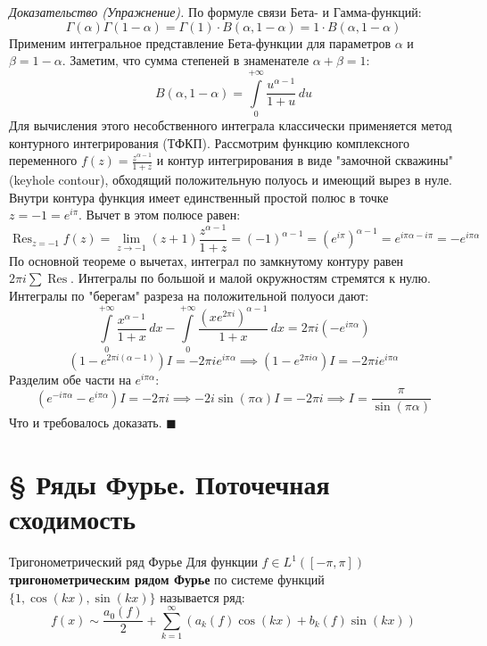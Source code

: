 \documentclass[12pt,a4paper]{article}
\newenvironment{Proof}[1][Доказательство]{\vspace{0.5em}\noindent\textit{#1.}\hspace{0.5em}\ignorespaces}{\hfill$\blacksquare$\vspace{1em}}
\begin{document}
\begin{Proof}[Доказательство (Упражнение)]
По формуле связи Бета- и Гамма-функций:
$$ \Gamma(\alpha)\Gamma(1-\alpha) = \Gamma(1) \cdot B(\alpha, 1-\alpha) = 1 \cdot B(\alpha, 1-\alpha) $$
Применим интегральное представление Бета-функции для параметров $\alpha$ и $\beta = 1-\alpha$. Заметим, что сумма степеней в знаменателе $\alpha + \beta = 1$:
$$ B(\alpha, 1-\alpha) = \int\limits_0^{+\infty} \frac{u^{\alpha-1}}{1+u} \, du $$
Для вычисления этого несобственного интеграла классически применяется метод контурного интегрирования (ТФКП). 
Рассмотрим функцию комплексного переменного $f(z) = \frac{z^{\alpha-1}}{1+z}$ и контур интегрирования в виде "замочной скважины" (keyhole contour), обходящий положительную полуось и имеющий вырез в нуле. Внутри контура функция имеет единственный простой полюс в точке $z = -1 = e^{i\pi}$.
Вычет в этом полюсе равен:
$$ \operatorname{Res}_{z=-1} f(z) = \lim\limits_{z \to -1} (z+1) \frac{z^{\alpha-1}}{1+z} = (-1)^{\alpha-1} = (e^{i\pi})^{\alpha-1} = e^{i\pi\alpha - i\pi} = -e^{i\pi\alpha} $$
По основной теореме о вычетах, интеграл по замкнутому контуру равен $2\pi i \sum \operatorname{Res}$. Интегралы по большой и малой окружностям стремятся к нулю. Интегралы по "берегам" разреза на положительной полуоси дают:
$$ \int\limits_0^{+\infty} \frac{x^{\alpha-1}}{1+x} \, dx - \int\limits_0^{+\infty} \frac{(x e^{2\pi i})^{\alpha-1}}{1+x} \, dx = 2\pi i (-e^{i\pi\alpha}) $$
$$ \left(1 - e^{2\pi i (\alpha-1)}\right) I = -2\pi i e^{i\pi\alpha} \implies \left(1 - e^{2\pi i \alpha}\right) I = -2\pi i e^{i\pi\alpha} $$
Разделим обе части на $e^{i\pi\alpha}$:
$$ \left(e^{-i\pi\alpha} - e^{i\pi\alpha}\right) I = -2\pi i \implies -2i \sin(\pi \alpha) I = -2\pi i \implies I = \frac{\pi}{\sin(\pi \alpha)} $$
Что и требовалось доказать.
\end{Proof}



\section{§ Ряды Фурье. Поточечная сходимость}

\begin{Definition}{Тригонометрический ряд Фурье}{}
Для функции $f \in L^1([-\pi, \pi])$ \textbf{тригонометрическим рядом Фурье} по системе функций $\{1, \cos(kx), \sin(kx)\}$ называется ряд:
$$ f(x) \sim \frac{a_0(f)}{2} + \sum\limits_{k=1}^{\infty} \left( a_k(f) \cos(kx) + b_k(f) \sin(kx) \right) $$
\end{Definition}
\end{document}
